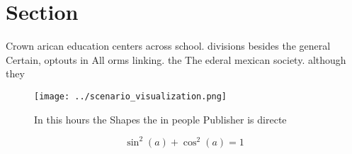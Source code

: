 \documentclass[a4paper]{article}
\begin{document}
\section{Section}

Crown arican education centers across school. divisions besides the general Certain, optouts in All orms linking. the The ederal mexican society. although they

\begin{figure}
\centering
\texttt{[image: ../scenario\_visualization.png]}
\caption{In this hours the Shapes the in people Publisher is directe
}
\end{figure}
 
\[ \sin^2(a)+\cos^2(a) = 1 \]
\end{document}
